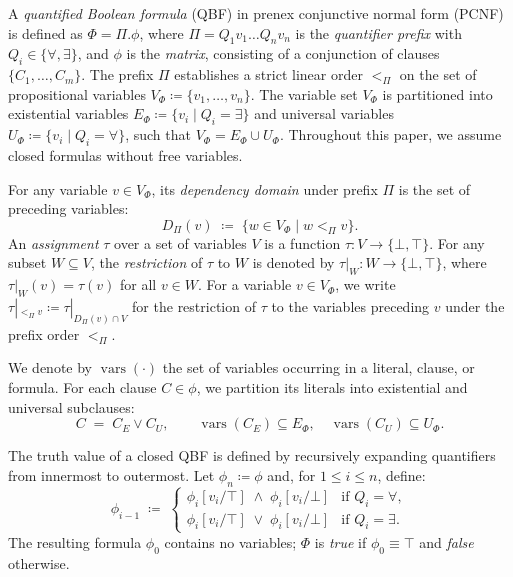 \documentclass[runningheads]{llncs}
\DeclareMathOperator{\vars}{vars}
\newcommand{\Bool}{\{\bot,\top\}}
\begin{document}
A \emph{quantified Boolean formula} (QBF) in prenex conjunctive normal form (PCNF) is defined as $\Phi = \Pi.\phi$, where $\Pi = Q_1 v_1 \dots Q_n v_n$ is the \emph{quantifier prefix} with $Q_i \in \{\forall, \exists\}$, and $\phi$ is the \emph{matrix}, consisting of a conjunction of clauses $\{C_1, \dots, C_m\}$.
The prefix $\Pi$ establishes a strict linear order $<_\Pi$ on the set of propositional variables $V_\Phi \coloneqq \{v_1, \dots, v_n\}$.
The variable set $V_\Phi$ is partitioned into existential variables $E_\Phi \coloneqq \{v_i \mid Q_i = \exists\}$ and universal variables $U_\Phi \coloneqq \{v_i \mid Q_i = \forall\}$, such that $V_\Phi = E_\Phi \cup U_\Phi$.
Throughout this paper, we assume closed formulas without free variables.

For any variable $v \in V_\Phi$, its \emph{dependency domain} under prefix $\Pi$ is the set of preceding variables:
\begin{equation}
    D_\Pi(v) \;\coloneqq\; \{w \in V_\Phi \mid w <_\Pi v\} .
\end{equation}
An \emph{assignment} $\tau$ over a set of variables $V$ is a function $\tau : V \to \Bool$.
For any subset $W \subseteq V$, the \emph{restriction} of $\tau$ to $W$ is denoted by $\tau|_W : W \to \Bool$, where $\tau|_W(v) = \tau(v)$ for all $v \in W$.
For a variable $v \in V_\Phi$, we write $\tau|_{<_\Pi v} \coloneqq \tau|_{D_\Pi(v) \cap V}$ for the restriction of $\tau$ to the variables preceding $v$ under the prefix order $<_\Pi$.

We denote by $\vars(\cdot)$ the set of variables occurring in a literal, clause, or formula.
For each clause $C \in \phi$, we partition its literals into existential and universal subclauses:
\begin{equation}
    C \;=\; C_E \lor C_U , \qquad \vars(C_E) \subseteq E_\Phi, \quad \vars(C_U) \subseteq U_\Phi .
\end{equation}

The truth value of a closed QBF is defined by recursively expanding quantifiers from innermost to outermost.
Let $\phi_n \coloneqq \phi$ and, for $1 \leq i \leq n$, define:
\begin{equation}
    \phi_{i-1} \;\coloneqq\;
    \begin{cases}
        \phi_i[v_i / \top] \;\land\; \phi_i[v_i / \bot] & \text{if } Q_i = \forall,  \\[2pt]
        \phi_i[v_i / \top] \;\lor\;  \phi_i[v_i / \bot] & \text{if } Q_i = \exists .
    \end{cases}
\end{equation}
The resulting formula $\phi_0$ contains no variables; $\Phi$ is \emph{true} if $\phi_0 \equiv \top$ and \emph{false} otherwise.
\end{document}
